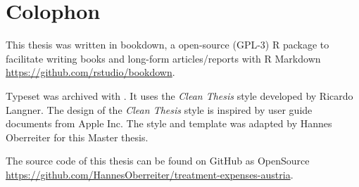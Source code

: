 \pagestyle{empty}
\hfill
\vfill
{}
\section*{Colophon}

This thesis was written in bookdown, a open-source (GPL-3) R package to facilitate writing books and long-form articles/reports with R Markdown \url{https://github.com/rstudio/bookdown}.

Typeset was archived with \LaTeXe. It uses the \textit{Clean Thesis} style developed by Ricardo Langner. The design of the \textit{Clean Thesis} style is inspired by user guide documents from Apple Inc. The style and template was adapted by Hannes Oberreiter for this Master thesis.

The source code of this thesis can be found on GitHub as OpenSource \url{https://github.com/HannesOberreiter/treatment-expenses-austria}.


